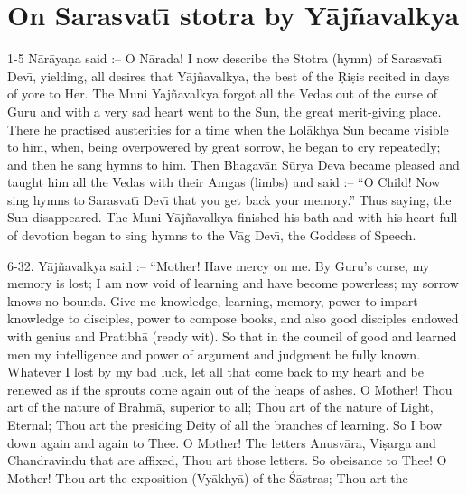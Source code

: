 \chapter{On Sarasvat\={\i} stotra by Y\=aj\~navalkya}

1-5 N\=ar\=aya\d{n}a said :-- O N\=arada! I now describe the Stotra (hymn) of Sarasvat\={\i} Dev\={\i}, yielding, all desires that Y\=aj\~navalkya, the best of the \d{R}i\d{s}is recited in days of yore to Her. The Muni Yaj\~navalkya forgot all the Vedas out of the curse of Guru and with a very sad heart went to the Sun, the great merit-giving place. There he practised austerities for a time when the Lol\=akhya Sun became visible to him, when, being overpowered by great sorrow, he began to cry repeatedly; and then he sang hymns to him. Then Bhagav\=an S\=urya Deva became pleased and taught him all the Vedas with their Amgas (limbs) and said :-- ``O Child! Now sing hymns to Sarasvat\={\i} Dev\={\i} that you get back your memory.'' Thus saying, the Sun disappeared. The Muni Y\=aj\~navalkya finished his bath and with his heart full of devotion began to sing hymns to the V\=ag Dev\={\i}, the Goddess of Speech.

6-32. Y\=aj\~navalkya said :-- ``Mother! Have mercy on me. By Guru's curse, my memory is lost; I am now void of learning and have become powerless; my sorrow knows no bounds. Give me knowledge, learning, memory, power to impart knowledge to disciples, power to compose books, and also good disciples endowed with genius and Pratibh\=a (ready wit). So that in the council of good and learned men my intelligence and power of argument and judgment be fully known. Whatever I lost by my bad luck, let all that come back to my heart and be renewed as if the sprouts come again out of the heaps of ashes. O Mother! Thou art of the nature of Brahm\=a, superior to all; Thou art of the nature of Light, Eternal; Thou art the presiding Deity of all the branches of learning. So I bow down again and again to Thee. O Mother! The letters Anusv\=ara, Vi\d{s}arga and Chandravindu that are affixed, Thou art those letters. So obeisance to Thee! O Mother! Thou art the exposition (Vy\=akhy\=a) of the \'S\=astras; Thou art the

